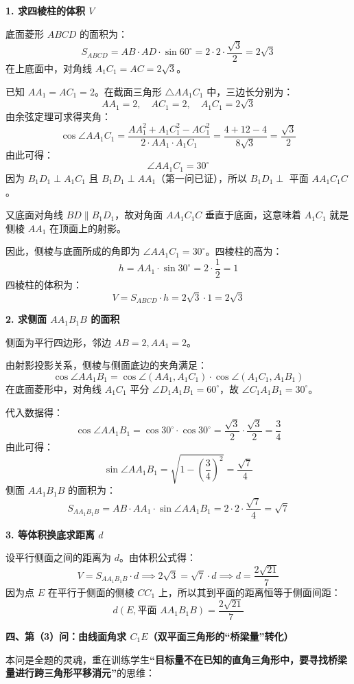 {  \noindent\textbf{1. 求四棱柱的体积 $V$}\par
  底面菱形 $ABCD$ 的面积为：
  \[ S_{ABCD} = AB \cdot AD \cdot \sin 60^\circ = 2 \cdot 2 \cdot \frac{\sqrt{3}}{2} = 2\sqrt{3} \]
  在上底面中，对角线 $A_1C_1 = AC = 2\sqrt{3}$。\par
  已知 $AA_1 = AC_1 = 2$。在截面三角形 $\triangle AA_1C_1$ 中，三边长分别为：
  \[ AA_1 = 2,\quad AC_1 = 2,\quad A_1C_1 = 2\sqrt{3} \]
  由余弦定理可求得夹角：
  \[ \cos\angle AA_1C_1 = \frac{AA_1^2 + A_1C_1^2 - AC_1^2}{2 \cdot AA_1 \cdot A_1C_1} = \frac{4 + 12 - 4}{8\sqrt{3}} = \frac{\sqrt{3}}{2} \]
  由此可得：
  \[ \angle AA_1C_1 = 30^\circ \]
  因为 $B_1D_1 \perp A_1C_1$ 且 $B_1D_1 \perp AA_1$（第一问已证），所以 $B_1D_1 \perp$ 平面 $AA_1C_1C$。\par
  又底面对角线 $BD \parallel B_1D_1$，故对角面 $AA_1C_1C$ 垂直于底面，这意味着 $A_1C_1$ 就是侧棱 $AA_1$ 在顶面上的射影。\par
  因此，侧棱与底面所成的角即为 $\angle AA_1C_1 = 30^\circ$。四棱柱的高为：
  \[ h = AA_1 \cdot \sin 30^\circ = 2 \cdot \frac{1}{2} = 1 \]
  四棱柱的体积为：
  \[ V = S_{ABCD} \cdot h = 2\sqrt{3} \cdot 1 = 2\sqrt{3} \]

  \noindent\textbf{2. 求侧面 $AA_1B_1B$ 的面积}\par
  侧面为平行四边形，邻边 $AB = 2, AA_1 = 2$。\par
  由射影投影关系，侧棱与侧面底边的夹角满足：
  \[ \cos\angle AA_1B_1 = \cos\angle(AA_1, A_1C_1) \cdot \cos\angle(A_1C_1, A_1B_1) \]
  在底面菱形中，对角线 $A_1C_1$ 平分 $\angle D_1A_1B_1 = 60^\circ$，故 $\angle C_1A_1B_1 = 30^\circ$。\par
  代入数据得：
  \[ \cos\angle AA_1B_1 = \cos 30^\circ \cdot \cos 30^\circ = \frac{\sqrt{3}}{2} \cdot \frac{\sqrt{3}}{2} = \frac{3}{4} \]
  由此可得：
  \[ \sin\angle AA_1B_1 = \sqrt{1 - \left(\frac{3}{4}\right)^2} = \frac{\sqrt{7}}{4} \]
  侧面 $AA_1B_1B$ 的面积为：
  \[ S_{AA_1B_1B} = AB \cdot AA_1 \cdot \sin\angle AA_1B_1 = 2 \cdot 2 \cdot \frac{\sqrt{7}}{4} = \sqrt{7} \]

  \noindent\textbf{3. 等体积换底求距离 $d$}\par
  设平行侧面之间的距离为 $d$。由体积公式得：
  \[ V = S_{AA_1B_1B} \cdot d \implies 2\sqrt{3} = \sqrt{7} \cdot d \implies d = \frac{2\sqrt{21}}{7} \]
  因为点 $E$ 在平行于侧面的侧棱 $CC_1$ 上，所以其到平面的距离恒等于侧面间距：
  \[ \boxed{d(E, \text{平面 } AA_1B_1B) = \frac{2\sqrt{21}}{7}} \]

  \medskip
  \noindent\textbf{四、第（3）问：由线面角求 $C_1E$（双平面三角形的“桥梁量”转化）}\par
  本问是全题的灵魂，重在训练学生\textbf{“目标量不在已知的直角三角形中，要寻找桥梁量进行跨三角形平移消元”}的思维：
  
}
